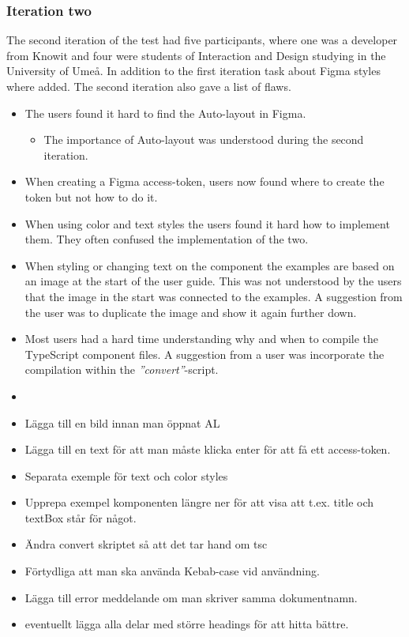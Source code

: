 \subsubsection{Iteration two}%
\label{ssub:Iteration two}

The second iteration of the test had five participants, where one was a developer from Knowit and four were students of Interaction and Design studying in the University of Umeå. In addition to the first iteration task about Figma styles where added. The second iteration also gave a list of flaws.


\begin{itemize}
   \item The users found it hard to find the Auto-layout in Figma.
      \begin{itemize}
         \item The importance of Auto-layout was understood during the second iteration.
      \end{itemize}
   \item When creating a Figma access-token, users now found where to create the token but not how to do it.
   \item When using color and text styles the users found it hard how to implement them. They often confused the implementation of the two. 
   \item When styling or changing text on the component the examples are based on an image at the start of the user guide. This was not understood by the users that the image in the start was connected to the examples. A suggestion from the user was to duplicate the image and show it again further down.
   \item Most users had a hard time understanding why and when to compile the TypeScript component files. A suggestion from a user was incorporate the compilation within the \textit{''convert''}-script.
   \item 
\end{itemize}

\begin{itemize}
   \item Lägga till en bild innan man öppnat AL
   \item Lägga till en text för att man måste klicka enter för att få ett access-token.
   \item Separata exemple för text och color styles
   \item Upprepa exempel komponenten längre ner för att visa att t.ex. title och textBox står för något.
   \item Ändra convert skriptet så att det tar hand om tsc
   \item Förtydliga att man ska använda Kebab-case vid användning.
   \item Lägga till error meddelande om man skriver samma dokumentnamn.
   \item eventuellt lägga alla delar med större headings för att hitta bättre.
\end{itemize}








